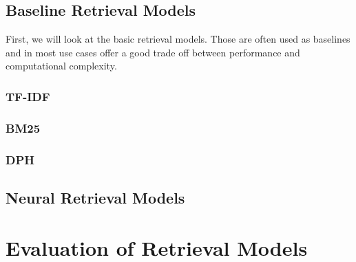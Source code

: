 \subsection{Baseline Retrieval Models}\label{baseline-retrieval-models}
First, we will look at the basic retrieval models.
Those are often used as baselines and in most use cases offer a good trade off between performance and computational complexity.

\subsubsection{TF-IDF}\label{tf-idf}
\subsubsection{BM25}\label{bm25}
\subsubsection{DPH}\label{dph}

\subsection{Neural Retrieval Models}\label{neural-retrieval-models}

\section{Evaluation of Retrieval Models}\label{evaluation-of-retrieval-models}